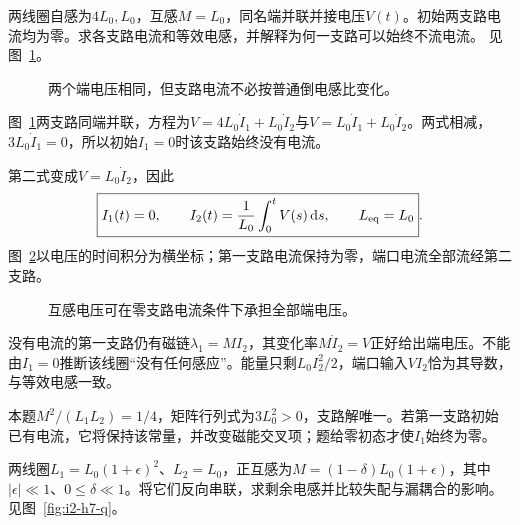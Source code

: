 \begin{exercise}[并联后完全不增流的支路]\label{ex:i2-h6}
两线圈自感为$4L_0,L_0$，互感$M=L_0$，同名端并联并接电压$V(t)$。初始两支路电流均为零。求各支路电流和等效电感，并解释为何一支路可以始终不流电流。 见图~\ref{fig:i2-h6-q}。
\end{exercise}

\begin{figure}[H]\centering
{}
\caption{两个端电压相同，但支路电流不必按普通倒电感比变化。}\label{fig:i2-h6-q}
\end{figure}
\begin{solution}
图~\ref{fig:i2-h6-q}两支路同端并联，方程为$V=4L_0\dot I_1+L_0\dot I_2$与$V=L_0\dot I_1+L_0\dot I_2$。两式相减，$3L_0\dot I_1=0$，所以初始$I_1=0$时该支路始终没有电流。

第二式变成$V=L_0\dot I_2$，因此
\[\boxed{I_1(t)=0,\qquad I_2(t)=\frac1{L_0}\int_0^tV(s)\mathop{}\!\mathrm d s,\qquad L_{\rm eq}=L_0}.
\]
图~\ref{fig:i2-h6-s}以电压的时间积分为横坐标；第一支路电流保持为零，端口电流全部流经第二支路。


\begin{figure}[H]\centering
{}
\caption{互感电压可在零支路电流条件下承担全部端电压。}\label{fig:i2-h6-s}
\end{figure}

没有电流的第一支路仍有磁链$\lambda_1=MI_2$，其变化率$M\dot I_2=V$正好给出端电压。不能由$I_1=0$推断该线圈“没有任何感应”。能量只剩$L_0I_2^2/2$，端口输入$VI_2$恰为其导数，与等效电感一致。

本题$M^2/(L_1L_2)=1/4$，矩阵行列式为$3L_0^2>0$，支路解唯一。若第一支路初始已有电流，它将保持该常量，并改变磁能交叉项；题给零初态才使$I_1$始终为零。
\end{solution}

\begin{exercise}[反向串联的误差敏感性]\label{ex:i2-h7}
两线圈$L_1=L_0(1+\epsilon)^2$、$L_2=L_0$，正互感为$M=(1-\delta)L_0(1+\epsilon)$，其中$|\epsilon|\ll1$、$0\le\delta\ll1$。将它们反向串联，求剩余电感并比较失配与漏耦合的影响。 见图~\ref{fig:i2-h7-q}。
\end{exercise}

